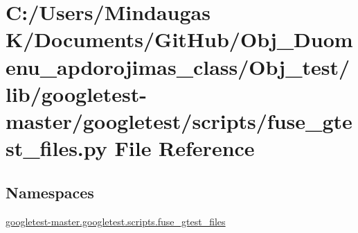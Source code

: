 \hypertarget{_obj__test_2lib_2googletest-master_2googletest_2scripts_2fuse__gtest__files_8py}{}\section{C\+:/\+Users/\+Mindaugas K/\+Documents/\+Git\+Hub/\+Obj\+\_\+\+Duomenu\+\_\+apdorojimas\+\_\+class/\+Obj\+\_\+test/lib/googletest-\/master/googletest/scripts/fuse\+\_\+gtest\+\_\+files.py File Reference}
\label{_obj__test_2lib_2googletest-master_2googletest_2scripts_2fuse__gtest__files_8py}
\subsection*{Namespaces}
\begin{DoxyCompactItemize}
\item 
 \mbox{\hyperlink{namespacegoogletest-master_1_1googletest_1_1scripts_1_1fuse__gtest__files}{googletest-\/master.\+googletest.\+scripts.\+fuse\+\_\+gtest\+\_\+files}}
\end{DoxyCompactItemize}
